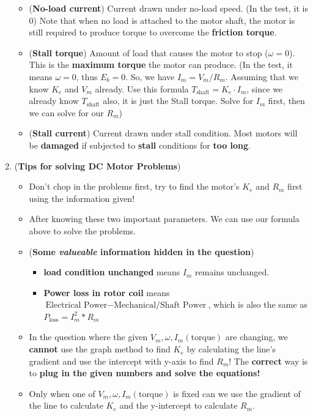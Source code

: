 \documentclass[10pt, landscape]{article}
\begin{document}
\begin{multicols}{4}
\begin{enumerate}
\begin{itemize}
        \item (\textbf{No-load current}) Current drawn under no-load speed. (In the test, it is 0) Note that when no load is attached to the motor shaft, the motor is still required to produce torque to overcome the \textbf{friction torque}.
        \item (\textbf{Stall torque}) Amount of load that causes the motor to stop ($\omega = 0$). This is the \textbf{maximum torque} the motor can produce. (In the test, it means $\omega=0$, thus $E_b=0$. So, we have $I_m=V_m/R_m$. Assuming that we know $K_e$ and $V_m$ already. Use this formula $T_{\text{shaft}}=K_e\cdot I_m$, since we already know $T_\text{shaft}$ also, it is just the Stall torque. Solve for $I_m$ first, then we can solve for our $R_m$)
        \item (\textbf{Stall current}) Current drawn under stall condition. Most motors will be \textbf{damaged} if subjected to \textbf{stall} conditions for \textbf{too long}.
    \end{itemize}
    \item (\textbf{Tips for solving DC Motor Problems})
    \begin{itemize}
        \item Don't chop in the problems first, try to find the motor's $K_e$ and $R_m$ first using the information given!
        \item After knowing these two important parameters. We can use our formula above to solve the problems.
        \item (\textbf{Some \textit{valueable} information hidden in the question})
        \begin{itemize}
            \item \textbf{load condition unchanged} means $I_m$ remains unchanged.
            \item \textbf{Power loss in rotor coil} means $\text{Electrical Power} - \text{Mechanical/Shaft Power}$, which is also the same as $P_{\text{loss}}=I_m^2*R_m$
        \end{itemize}
        \item In the question where the given $V_m, \omega, I_m(\text{torque})$ are changing, we \textbf{cannot} use the graph method to find $K_e$ by calculating the line's gradient and use the intercept with y-axis to find $R_m$! The \textbf{correct} way is to \textbf{plug in the given numbers and solve the equations!}
        \item Only when one of $V_m, \omega, I_m(\text{torque})$ is fixed can we use the gradient of the line to calculate $K_e$ and the y-intercept to calculate $R_m$.
    \end{itemize}
\end{enumerate}


\end{multicols}
\end{document}
